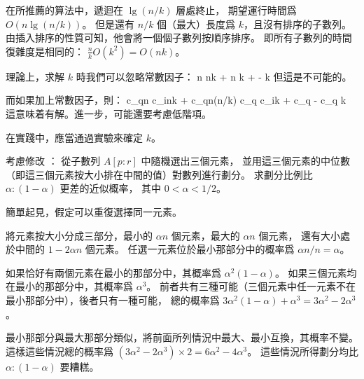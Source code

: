 \startANSWER
在所推薦的算法中，遞迴在 $\lg(n/k)$ 層處終止，
期望運行時間爲 $O(n\lg(n/k))$。
但是還有 $n/k$ 個（最大）長度爲 $k$，且沒有排序的子數列。
由插入排序的性質可知，他會將一個個子數列按順序排序。
即所有子數列的時間復雜度是相同的： $\frac{n}{k}O(k^2)=O(nk)$。

理論上，求解 $k$ 時我們可以忽略常數因子：
\startsplitformula\startmathalignment[n=1]
\NC n \ge nk + n \NR
\NC \Downarrow \NR
\NC {} \ge k +  -  \NR
\NC \Downarrow \NR
\NC {} \ge k \NR
\stopmathalignment\stopsplitformula
但這是不可能的。

而如果加上常數因子，則：
\startsplitformula\startmathalignment[n=1]
\NC c_qn \ge c_ink + c_qn\lg(n/k) \NR
\NC \Downarrow \NR
\NC c_q \ge c_ik + c_q - c_q \NR
\NC \Downarrow \NR
\NC {} \ge {}k \NR
\stopmathalignment\stopsplitformula
這意味着有解。進一步，可能還要考慮低階項。

在實踐中，應當通過實驗來確定 $k$。
\stopANSWER

\DIFFICULT
考慮修改 ：
從子數列 $A[p:r]$ 中隨機選出三個元素，
並用這三個元素的中位數（即這三個元素按大小排在中間的值）對數列進行劃分。
求劃分比例比 $\alpha:(1-\alpha)$ 更差的近似概率，
其中 $0<\alpha<1/2$。
\stopEXERCISE

\startANSWER
簡單起見，假定可以重復選擇同一元素。

將元素按大小分成三部分，最小的 $\alpha n$ 個元素，最大的 $\alpha n$ 個元素，
還有大小處於中間的 $1-2\alpha n$ 個元素。
任選一元素位於最小那部分中的概率爲 $\alpha n/n = \alpha$。

如果恰好有兩個元素在最小的那部分中，其概率爲 $\alpha^2(1-\alpha)$。
如果三個元素均在最小的那部分中，其概率爲 $\alpha^3$。
前者共有三種可能（三個元素中任一元素不在最小那部分中），後者只有一種可能，
總的概率爲 $3\alpha^2(1-\alpha)+\alpha^3 = 3\alpha^2-2\alpha^3$。

最小那部分與最大那部分類似，將前面所列情況中最大、最小互換，其概率不變。
這樣這些情況總的概率爲 $(3\alpha^2-2\alpha^3) \times 2 = 6\alpha^2-4\alpha^3$。
這些情況所得劃分均比 $\alpha:(1-\alpha)$ 要糟糕。
\stopANSWER
